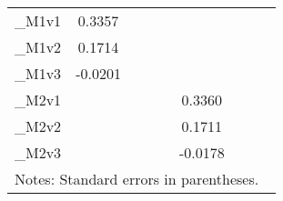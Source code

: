 \begin{table}[htbp]
\begin{tabular}{l*{8}{c}}
\hline
\_M1v1                    &    0.3357         &                   &                   &                   &                   &                   &                   &                   \\
\_M1v2                    &    0.1714         &                   &                   &                   &                   &                   &                   &                   \\
\_M1v3                    &   -0.0201         &                   &                   &                   &                   &                   &                   &                   \\
\_M2v1                    &                   &                   &                   &                   &    0.3360         &                   &                   &                   \\
\_M2v2                    &                   &                   &                   &                   &    0.1711         &                   &                   &                   \\
\_M2v3                    &                   &                   &                   &                   &   -0.0178         &                   &                   &                   \\
\hline\hline
\multicolumn{9}{l}{\footnotesize Notes: Standard errors in parentheses.}\\
\end{tabular}
\end{table}
